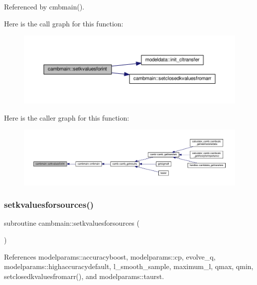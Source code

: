 Referenced by cmbmain().

Here is the call graph for this function\+:
\nopagebreak
\begin{figure}[H]
\begin{center}
\leavevmode
\includegraphics[width=350pt]{namespacecambmain_ad0f2dd9e839652502a6e34c32ec44e0d_cgraph}
\end{center}
\end{figure}
Here is the caller graph for this function\+:
\nopagebreak
\begin{figure}[H]
\begin{center}
\leavevmode
\includegraphics[width=350pt]{namespacecambmain_ad0f2dd9e839652502a6e34c32ec44e0d_icgraph}
\end{center}
\end{figure}
\mbox{\label{namespacecambmain_a63fe5ba29fa3c5116ef8bc646e7aa09c}} 
\subsubsection{\texorpdfstring{setkvaluesforsources()}{setkvaluesforsources()}}
{\footnotesize\ttfamily subroutine cambmain\+::setkvaluesforsources (\begin{DoxyParamCaption}{ }\end{DoxyParamCaption})}



References modelparams\+::accuracyboost, modelparams\+::cp, evolve\+\_\+q, modelparams\+::highaccuracydefault, l\+\_\+smooth\+\_\+sample, maximum\+\_\+l, qmax, qmin, setclosedkvaluesfromarr(), and modelparams\+::taurst.




